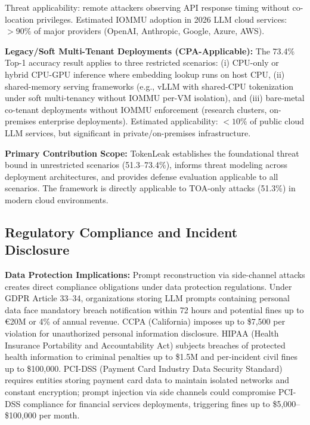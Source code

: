 \documentclass[conference,10pt,twocolumn]{IEEEtran}
\begin{document}
Threat applicability: remote attackers observing API response timing without
co-location privileges. Estimated IOMMU adoption in 2026 LLM cloud services: $>90\%$
of major providers (OpenAI, Anthropic, Google, Azure, AWS).

\textbf{Legacy/Soft Multi-Tenant Deployments (CPA-Applicable):}
The 73.4\% Top-1 accuracy result applies to three restricted scenarios:
(i) CPU-only or hybrid CPU-GPU inference where embedding lookup runs on host CPU,
(ii) shared-memory serving frameworks (e.g., vLLM with shared-CPU tokenization under
soft multi-tenancy without IOMMU per-VM isolation), and (iii) bare-metal co-tenant
deployments without IOMMU enforcement (research clusters, on-premises enterprise deployments).
Estimated applicability: $<10\%$ of public cloud LLM services, but significant in
private/on-premises infrastructure.

\textbf{Primary Contribution Scope:} TokenLeak establishes the foundational threat bound
in unrestricted scenarios (51.3--73.4\%), informs threat modeling across deployment architectures,
and provides defense evaluation applicable to all scenarios. The framework is directly applicable
to TOA-only attacks (51.3\%) in modern cloud environments.

\subsection{Regulatory Compliance and Incident Disclosure}

\textbf{Data Protection Implications:}
Prompt reconstruction via side-channel attacks creates direct compliance obligations
under data protection regulations. Under GDPR Article 33--34, organizations storing
LLM prompts containing personal data face mandatory breach notification within 72 hours
and potential fines up to €20M or 4\% of annual revenue. CCPA (California) imposes
up to \$7,500 per violation for unauthorized personal information disclosure.
HIPAA (Health Insurance Portability and Accountability Act) subjects breaches of
protected health information to criminal penalties up to \$1.5M and per-incident
civil fines up to \$100,000. PCI-DSS (Payment Card Industry Data Security Standard)
requires entities storing payment card data to maintain isolated networks and constant
encryption; prompt injection via side channels could compromise PCI-DSS compliance
for financial services deployments, triggering fines up to \$5,000--\$100,000 per month.
\end{document}
